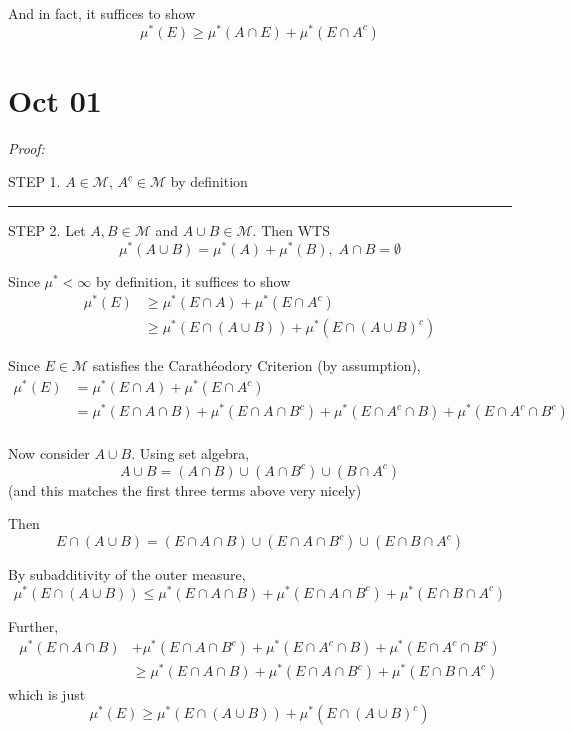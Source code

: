 \documentclass[12pt]{report}
\newcommand{\M}{\mathcal{M}}
\renewcommand{\div}{\vspace*{10pt}\hrule\vspace*{10pt}}
\newenvironment*{tbox}[2][gray]{
    \begin{tcolorbox}[
        parbox=false,
        colback=#1!5!white,
        colframe=#1!75!black,
        breakable,
        title={#2}
    ]}
    {\end{tcolorbox}}
\begin{document}
        And in fact, it suffices to show 
        \[\mu^*(E) \geq \mu^*(A \cap E) + \mu^*(E\cap A^c)\] 


\section*{Oct 01}

    \begin{tbox}{\textbf{Carathéodory Procedure:} If $\mu^*$ is an outer measure and $\M$ are $\mu^*$-measurable sets, then $\M$ is a $\sigma$-algebra and $\mu^*\big\vert_{\M}$ is a measure on $\M$}
        
        \emph{Proof:} 

        STEP 1. $A \in \M$, $A^c \in \M$ by definition

        \div 

        STEP 2. Let $A, B \in \M$ and $A \cup B \in \M$. Then WTS
        \[\mu^*(A \cup B) = \mu^*(A) + \mu^*(B), \; A \cap B = \emptyset\]

        Since $\mu^* < \infty$ by definition, it suffices to show 
        \begin{align*}
            \mu^*(E) &\geq \mu^*(E \cap A) + \mu^*(E \cap A^c)\\ 
            &\geq \mu^*(E \cap (A \cup B)) + \mu^*(E \cap (A \cup B)^c)
        \end{align*}

        Since $E \in \M$ satisfies the Carathéodory Criterion (by assumption), 
        \begin{align*}
            \mu^*(E) &= \mu^*(E \cap A) + \mu^*(E \cap A^c)\\ 
            &= \mu^*(E \cap A \cap B) + \mu^*(E \cap A \cap B^c) + \mu^*(E \cap A^c \cap B) + \mu^*(E \cap A^c \cap B^c)\\
        \end{align*}
        
        Now consider $A \cup B$. Using set algebra, 
        \[A \cup B = (A \cap B) \cup (A \cap B^c) \cup (B \cap A^c)\]
        (and this matches the first three terms above very nicely)

        Then 
        \[E \cap (A \cup B) = (E \cap A \cap B) \cup (E \cap A \cap B^c) \cup (E \cap B \cap A^c)\]
        
        By subadditivity of the outer measure, 
        \[\mu^*(E \cap (A \cup B)) \leq \mu^*(E \cap A \cap B) + \mu^*(E \cap A \cap B^c) + \mu^*(E \cap B \cap A^c)\]

        Further, 
        \begin{align*}
            \mu^*(E \cap A \cap B) &+ \mu^*(E \cap A \cap B^c) + \mu^*(E \cap A^c \cap B) + \mu^*(E \cap A^c \cap B^c)\\ 
                &\geq \mu^*(E \cap A \cap B) + \mu^*(E \cap A \cap B^c) + \mu^*(E \cap B \cap A^c)
        \end{align*}
        which is just 
        \[\mu^*(E) \geq \mu^*(E \cap (A\cup B)) + \mu^*(E \cap (A \cup B)^c)\]


\end{tbox}
\end{document}
